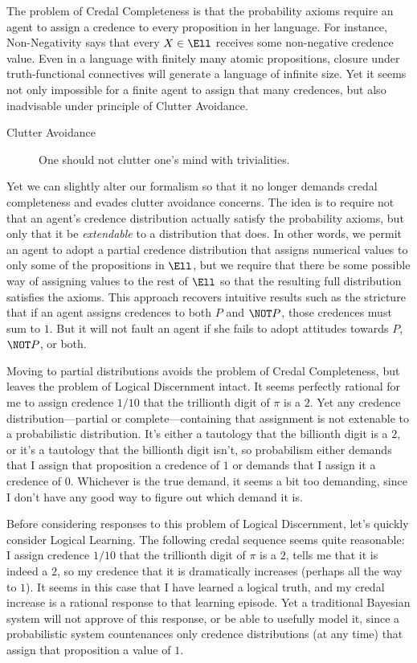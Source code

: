 The problem of Credal Completeness is that the probability axioms require an agent to assign a credence to every proposition in her language. For instance, Non-Negativity says that every $X \in \Ell$ receives some non-negative credence value. Even in a language with finitely many atomic propositions, closure under truth-functional connectives will generate a language of infinite size. Yet it seems not only impossible for a finite agent to assign that many credences, but also inadvisable under  principle of Clutter Avoidance.
\begin{description}
\item[Clutter Avoidance]{One should not clutter one's mind with trivialities.} 
\end{description}
Yet we can slightly alter our formalism so that it no longer demands credal completeness and evades clutter avoidance concerns. The idea is to require not that an agent's credence distribution actually satisfy the probability axioms, but only that it be \emph{extendable} to a distribution that does. In other words, we permit an agent to adopt a partial credence distribution that assigns numerical values to only some of the propositions in $\Ell$, but we require that there be some possible way of assigning values to the rest of $\Ell$ so that the resulting full distribution satisfies the axioms. This approach recovers intuitive results such as the stricture that if an agent assigns credences to both $P$ and $\NOT P$, those credences must sum to $1$. But it will not fault an agent if she fails to adopt attitudes towards $P$, $\NOT P$, or both.

Moving to partial distributions avoids the problem of Credal Completeness, but leaves the problem of Logical Discernment intact. It seems perfectly rational for me to assign credence $1/10$ that the trillionth digit of $\pi$ is a $2$. Yet any credence distribution---partial or complete---containing that assignment is not extenable to a probabilistic distribution. It's either a tautology that the billionth digit is a $2$, or it's a tautology that the billionth digit isn't, so probabilism either demands that I assign that proposition a credence of $1$ or demands that I assign it a credence of $0$. Whichever is the true demand, it seems a bit too demanding, since I don't have any good way to figure out which demand it is.

Before considering responses to this problem of Logical Discernment, let's quickly consider Logical Learning. The following credal sequence seems quite reasonable: I assign credence $1/10$ that the trillionth digit of $\pi$ is a $2$, \citet{TalbottTwoPrinciples} tells me that it is indeed a $2$, so my credence that it is dramatically increases (perhaps all the way to $1$). It seems in this case that I have learned a logical truth, and my credal increase is a rational response to that learning episode. Yet a traditional Bayesian system will not approve of this response, or be able to usefully model it, since a probabilistic system countenances only credence distributions (at any time) that assign that proposition a value of $1$.

